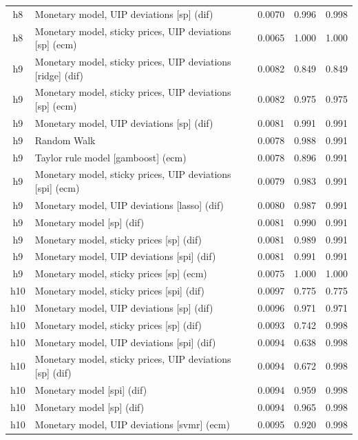 \begin{ThreePartTable}
\begin{longtable}[t]{cp{5.5cm}ccc}
h8 & \raggedright Monetary model, UIP deviations [sp] (dif) & 0.0070 & 0.996 & 0.998\\
h8 & \raggedright Monetary model, sticky prices, UIP deviations [sp] (ecm) & 0.0065 & 1.000 & 1.000\\
\addlinespace
h9 & \raggedright Monetary model, sticky prices, UIP deviations [ridge] (dif) & 0.0082 & 0.849 & 0.849\\
h9 & \raggedright Monetary model, sticky prices, UIP deviations [sp] (ecm) & 0.0082 & 0.975 & 0.975\\
h9 & \raggedright Monetary model, UIP deviations [sp] (dif) & 0.0081 & 0.991 & 0.991\\
h9 & \raggedright Random Walk & 0.0078 & 0.988 & 0.991\\
h9 & \raggedright Taylor rule model [gamboost] (ecm) & 0.0078 & 0.896 & 0.991\\
h9 & \raggedright Monetary model, sticky prices, UIP deviations [spi] (ecm) & 0.0079 & 0.983 & 0.991\\
h9 & \raggedright Monetary model, UIP deviations [lasso] (dif) & 0.0080 & 0.987 & 0.991\\
h9 & \raggedright Monetary model [sp] (dif) & 0.0081 & 0.990 & 0.991\\
h9 & \raggedright Monetary model, sticky prices [sp] (dif) & 0.0081 & 0.989 & 0.991\\
h9 & \raggedright Monetary model, UIP deviations [spi] (dif) & 0.0081 & 0.991 & 0.991\\
h9 & \raggedright Monetary model, sticky prices [sp] (ecm) & 0.0075 & 1.000 & 1.000\\
\addlinespace
h10 & \raggedright Monetary model, sticky prices [spi] (dif) & 0.0097 & 0.775 & 0.775\\
h10 & \raggedright Monetary model, UIP deviations [sp] (dif) & 0.0096 & 0.971 & 0.971\\
h10 & \raggedright Monetary model, sticky prices [sp] (dif) & 0.0093 & 0.742 & 0.998\\
h10 & \raggedright Monetary model, UIP deviations [spi] (dif) & 0.0094 & 0.638 & 0.998\\
h10 & \raggedright Monetary model, sticky prices, UIP deviations [sp] (dif) & 0.0094 & 0.672 & 0.998\\
h10 & \raggedright Monetary model [spi] (dif) & 0.0094 & 0.959 & 0.998\\
h10 & \raggedright Monetary model [sp] (dif) & 0.0094 & 0.965 & 0.998\\
h10 & \raggedright Monetary model, UIP deviations [svmr] (ecm) & 0.0095 & 0.920 & 0.998\\

\end{longtable}
\end{ThreePartTable}
